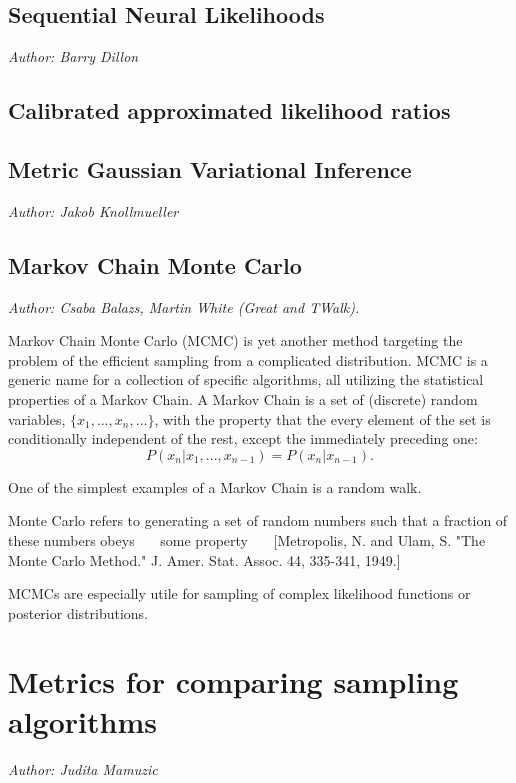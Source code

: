 \documentclass[11pt]{article}
\begin{document}
\subsection{Sequential Neural Likelihoods}
\emph{Author: Barry Dillon}

\subsection{Calibrated approximated likelihood ratios}

\subsection{Metric Gaussian Variational Inference}
\emph{Author: Jakob Knollmueller}

\subsection{Markov Chain Monte Carlo}
\label{sec:MCMC}
\emph{Author: Csaba Balazs, Martin White (Great and TWalk).} 

Markov Chain Monte Carlo (MCMC) is yet another method targeting the problem of the efficient sampling from a complicated distribution.  
%
MCMC is a generic name for a collection of specific algorithms, all utilizing the statistical properties of a Markov Chain.
%
A Markov Chain is a set of (discrete) random variables, $\{x_1, ..., x_n, ...\}$, with the property that the every element of the set is conditionally independent of the rest, except the immediately preceding one:
\begin{equation}
	P(x_n|x_1,...,x_{n-1}) = P(x_n|x_{n-1}) .
\end{equation}

One of the simplest examples of a Markov Chain is a random walk.

Monte Carlo refers to generating a set of random numbers such that a fraction of these numbers obeys ~~~some property~~~
[Metropolis, N. and Ulam, S. "The Monte Carlo Method." J. Amer. Stat. Assoc. 44, 335-341, 1949.]

MCMCs are especially utile for sampling of complex likelihood functions or posterior distributions. 

\section{Metrics for comparing sampling algorithms}
\label{sec:metrics}
\emph{Author: Judita Mamuzic}
\end{document}
